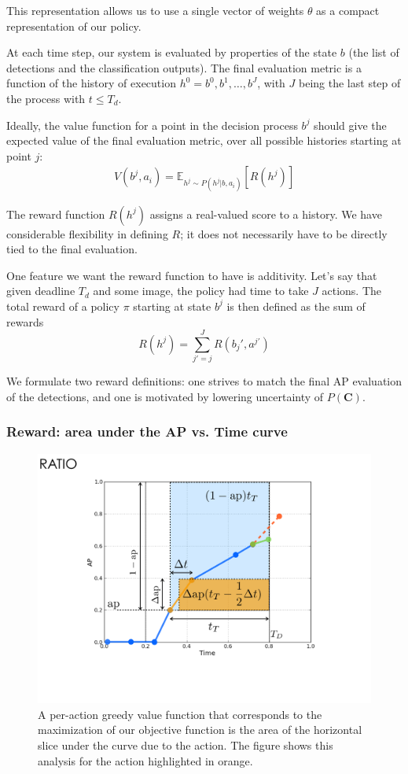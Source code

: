 This representation allows us to use a single vector of weights $\theta$ as a compact representation of our policy.

At each time step, our system is evaluated by properties of the state $b$ (the list of detections and the classification outputs).
The final evaluation metric is a function of the history of execution $h^0=b^0,b^1,\dots,b^J$, with $J$ being the last step of the process with $t \le T_d$.

Ideally, the value function for a point in the decision process $b^j$ should give the expected value of the final evaluation metric, over all possible histories starting at point $j$:
\begin{align}
V(b^j,a_i) = \mathbb{E}_{h^j \sim P(h^j|b,a_i)}[R(h^j)]
\end{align}

The reward function $R(h^j)$ assigns a real-valued score to a history.
We have considerable flexibility in defining $R$; it does not necessarily have to be directly tied to the final evaluation.

One feature we want the reward function to have is additivity.
Let's say that given deadline $T_d$ and some image, the policy had time to take $J$ actions.
The total reward of a policy $\pi$ starting at state $b^j$ is then defined as the sum of rewards
\begin{equation}
R(h^j) = \sum_{j'=j}^J R(b_j',a^{j'})
\end{equation}

We formulate two reward definitions: one strives to match the final AP evaluation of the detections, and one is motivated by lowering uncertainty of $P(\mathbf{C})$.

\subsubsection{Reward: area under the AP vs. Time curve}
\begin{figure}[htb]
  \centering
  \includegraphics[width=0.56\linewidth]{../figures/apvst_expl.pdf}
  \caption{A per-action greedy value function that corresponds to the maximization of our objective function is the area of the horizontal slice under the curve due to the action. The figure shows this analysis for the action highlighted in orange.}
  \label{fig:rewards}
\end{figure}


